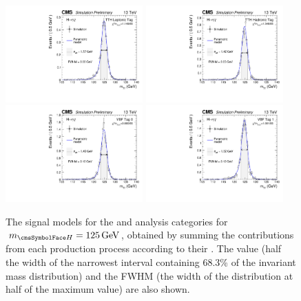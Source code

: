 \begin{figure}[ht!]
\centering
\includegraphics[width=0.47\textwidth]{modellingFigures/DCBpG/TTHLeptonicTag.pdf} 
\includegraphics[width=0.47\textwidth]{modellingFigures/DCBpG/TTHHadronicTag.pdf}  \\
\includegraphics[width=0.47\textwidth]{modellingFigures/DCBpG/VBFTag_0.pdf} 
\includegraphics[width=0.47\textwidth]{modellingFigures/DCBpG/VBFTag_1.pdf}\\ 

\caption{The signal models for the \VBFTag and \TTHTag analysis categories for $\mH=125\GeV$, obtained by summing the contributions from each production process according to their \effxacc. The \effSigma value (half the width of the narrowest interval containing 68.3\% of the invariant mass distribution) and the FWHM (the width of the distribution at half of the maximum value) are also shown.}

\label{fig:model:sig_model_per_category_bis}
\end{figure}


